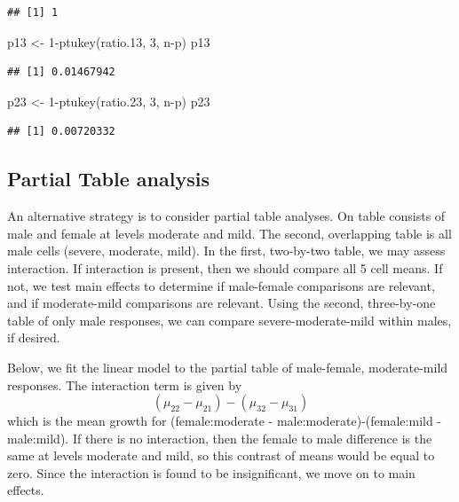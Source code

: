 \documentclass[
]{book}
\newenvironment{Shaded}{\begin{snugshade}}{\end{snugshade}}
\newcommand{\DecValTok}[1]{\textcolor[rgb]{0.00,0.00,0.81}{#1}}
\newcommand{\FloatTok}[1]{\textcolor[rgb]{0.00,0.00,0.81}{#1}}
\newcommand{\FunctionTok}[1]{\textcolor[rgb]{0.00,0.00,0.00}{#1}}
\newcommand{\NormalTok}[1]{#1}
\newcommand{\OtherTok}[1]{\textcolor[rgb]{0.56,0.35,0.01}{#1}}
\newcommand{\SpecialCharTok}[1]{\textcolor[rgb]{0.00,0.00,0.00}{#1}}
\begin{document}
\begin{verbatim}
## [1] 1
\end{verbatim}

\begin{Shaded}
\begin{Highlighting}[]
\NormalTok{p13 }\OtherTok{\textless{}{-}} \DecValTok{1}\SpecialCharTok{{-}}\FunctionTok{ptukey}\NormalTok{(ratio}\FloatTok{.13}\NormalTok{, }\DecValTok{3}\NormalTok{, n}\SpecialCharTok{{-}}\NormalTok{p)}
\NormalTok{p13}
\end{Highlighting}
\end{Shaded}

\begin{verbatim}
## [1] 0.01467942
\end{verbatim}

\begin{Shaded}
\begin{Highlighting}[]
\NormalTok{p23 }\OtherTok{\textless{}{-}} \DecValTok{1}\SpecialCharTok{{-}}\FunctionTok{ptukey}\NormalTok{(ratio}\FloatTok{.23}\NormalTok{, }\DecValTok{3}\NormalTok{, n}\SpecialCharTok{{-}}\NormalTok{p)}
\NormalTok{p23}
\end{Highlighting}
\end{Shaded}

\begin{verbatim}
## [1] 0.00720332
\end{verbatim}

\hypertarget{partial-table-analysis}{%
\subsection{Partial Table analysis}\label{partial-table-analysis}}

An alternative strategy is to consider partial table analyses. On table consists of male and female at levels moderate and mild. The second, overlapping table is all male cells (severe, moderate, mild). In the first, two-by-two table, we may assess interaction. If interaction is present, then we should compare all 5 cell means. If not, we test main effects to determine if male-female comparisons are relevant, and if moderate-mild comparisons are relevant. Using the second, three-by-one table of only male responses, we can compare severe-moderate-mild within males, if desired.

Below, we fit the linear model to the partial table of male-female, moderate-mild responses. The interaction term is given by
\[(\mu_{22}-\mu_{21}) - (\mu_{32}-\mu_{31})\]
which is the mean growth for (female:moderate - male:moderate)-(female:mild - male:mild). If there is no interaction, then the female to male difference is the same at levels moderate and mild, so this contrast of means would be equal to zero. Since the interaction is found to be insignificant, we move on to main effects.
\end{document}
